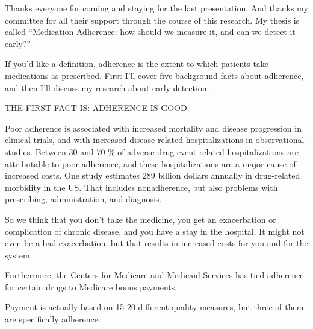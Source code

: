 \documentclass[12pt]{report}
\begin{document}
\begin{large}
Thanks everyone for coming and staying for the last presentation. And
thanks my committee for all their support through the course of this
research. My thesis is called ``Medication Adherence: how should we
measure it, and can we detect it early?'' %

If you'd like a definition, adherence is the extent to which patients
take medications as prescribed. First I'll cover five background facts
about adherence, and then I'll discuss my research about early
detection.

THE FIRST FACT IS: ADHERENCE IS GOOD. %

Poor adherence is associated with increased mortality and disease
progression in clinical trials, and with increased disease-related
hospitalizations in observational studies. Between 30 and 70 \% of
adverse drug event-related hospitalizations are attributable to poor
adherence, and these hospitalizations are a major cause of increased
costs. One study estimates 289 billion dollars annually in
drug-related morbidity in the US. That includes nonadherence, but also
problems with prescribing, administration, and diagnosis. %
\end{large}

So we think that you don't take the medicine, you get an exacerbation
or complication of chronic disease, and you have a stay in the
hospital. It might not even be a bad exacerbation, but that results in
increased costs for you and for the system.

\begin{large}
Furthermore, the Centers for Medicare and Medicaid Services has tied
adherence for certain drugs to Medicare bonus payments. %
\end{large}

Payment is actually based on 15-20 different quality measures, but
three of them are specifically adherence.
\end{document}

